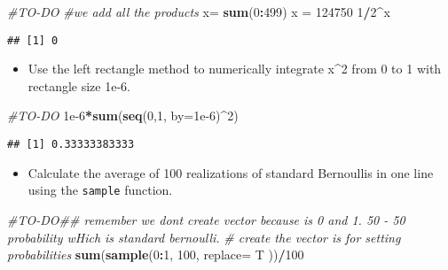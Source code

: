 \documentclass[]{article}
\newenvironment{Shaded}{\begin{snugshade}}{\end{snugshade}}
\newcommand{\KeywordTok}[1]{\textcolor[rgb]{0.13,0.29,0.53}{\textbf{#1}}}
\newcommand{\DataTypeTok}[1]{\textcolor[rgb]{0.13,0.29,0.53}{#1}}
\newcommand{\DecValTok}[1]{\textcolor[rgb]{0.00,0.00,0.81}{#1}}
\newcommand{\FloatTok}[1]{\textcolor[rgb]{0.00,0.00,0.81}{#1}}
\newcommand{\StringTok}[1]{\textcolor[rgb]{0.31,0.60,0.02}{#1}}
\newcommand{\CommentTok}[1]{\textcolor[rgb]{0.56,0.35,0.01}{\textit{#1}}}
\newcommand{\OperatorTok}[1]{\textcolor[rgb]{0.81,0.36,0.00}{\textbf{#1}}}
\newcommand{\NormalTok}[1]{#1}
\providecommand{\tightlist}{%
  \setlength{\itemsep}{0pt}\setlength{\parskip}{0pt}}
\begin{document}
\begin{Shaded}
\begin{Highlighting}[]
\CommentTok{#TO-DO}
\CommentTok{#we add all the products }
\NormalTok{x=}\StringTok{ }\KeywordTok{sum}\NormalTok{(}\DecValTok{0}\OperatorTok{:}\DecValTok{499}\NormalTok{)}
\NormalTok{x =}\StringTok{ }\DecValTok{124750}
\DecValTok{1}\OperatorTok{/}\DecValTok{2}\OperatorTok{^}\NormalTok{x}
\end{Highlighting}
\end{Shaded}

\begin{verbatim}
## [1] 0
\end{verbatim}

\begin{itemize}
\tightlist
\item
  Use the left rectangle method to numerically integrate x\^{}2 from 0
  to 1 with rectangle size 1e-6.
\end{itemize}

\begin{Shaded}
\begin{Highlighting}[]
\CommentTok{#TO-DO}
\FloatTok{1e-6}\OperatorTok{*}\KeywordTok{sum}\NormalTok{(}\KeywordTok{seq}\NormalTok{(}\DecValTok{0}\NormalTok{,}\DecValTok{1}\NormalTok{, }\DataTypeTok{by=}\FloatTok{1e-6}\NormalTok{)}\OperatorTok{^}\DecValTok{2}\NormalTok{)}
\end{Highlighting}
\end{Shaded}

\begin{verbatim}
## [1] 0.33333383333
\end{verbatim}

\begin{itemize}
\tightlist
\item
  Calculate the average of 100 realizations of standard Bernoullis in
  one line using the \texttt{sample} function.
\end{itemize}

\begin{Shaded}
\begin{Highlighting}[]
\CommentTok{#TO-DO## remember we dont create vector because is 0 and 1. 50 - 50 probability wHich is standard bernoulli.}
\CommentTok{# create the vector is for setting probabilities}
\KeywordTok{sum}\NormalTok{(}\KeywordTok{sample}\NormalTok{(}\DecValTok{0}\OperatorTok{:}\DecValTok{1}\NormalTok{, }\DecValTok{100}\NormalTok{, }\DataTypeTok{replace=}\NormalTok{ T ))}\OperatorTok{/}\DecValTok{100}
\end{Highlighting}
\end{Shaded}
\end{document}
